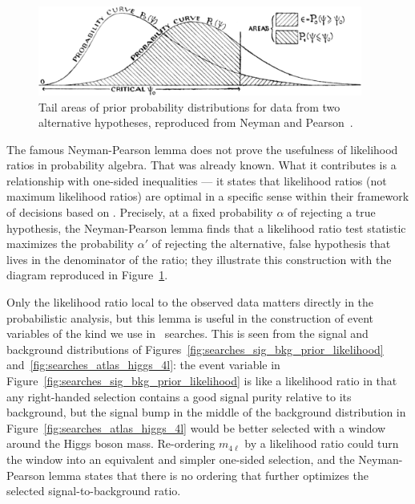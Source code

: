 \begin{figure}[tp]
\centering
\includegraphics[width=0.95\textwidth]{figures/searches_np_curves_crop.png}
\caption[
Tail areas of prior probability distributions for data from two alternative
hypotheses, reproduced from Neyman and Pearson
]{%
Tail areas of prior probability distributions for data from two alternative
hypotheses, reproduced from Neyman and Pearson~\cite{neymanpearson1933lemma}.
}
\label{fig:searches_np_tails}
\end{figure}

The famous Neyman-Pearson lemma does not prove the usefulness of likelihood
ratios in probability algebra.
That was already known.
What it contributes is a relationship with one-sided inequalities ---
it states that likelihood ratios (not maximum likelihood ratios)
are optimal in a specific sense within their framework of decisions
based on \pvalues.
Precisely, at a fixed probability $\alpha$ of rejecting a true hypothesis,
the Neyman-Pearson lemma finds that a likelihood ratio test statistic maximizes
the probability $\alpha'$ of rejecting the alternative, false hypothesis that
lives in the denominator of the ratio; they illustrate this construction with
the diagram reproduced in Figure~\ref{fig:searches_np_tails}.

Only the likelihood ratio local to the observed data matters directly in the
probabilistic analysis, but this lemma is useful in the construction
of event variables of the kind we use in \atlas\ searches.
This is seen from the signal and background distributions of
Figures~\ref{fig:searches_sig_bkg_prior_likelihood}
and~\ref{fig:searches_atlas_higgs_4l}:
the event variable in Figure~\ref{fig:searches_sig_bkg_prior_likelihood} is
like a likelihood ratio in that any right-handed selection contains a good
signal purity relative to its background, but the signal bump in the
middle of the background distribution in
Figure~\ref{fig:searches_atlas_higgs_4l} would be better selected with a
window around the Higgs boson mass.
Re-ordering $m_{4\ell}$ by a likelihood ratio could turn the window
into an equivalent and simpler one-sided selection, and the Neyman-Pearson
lemma states that there is no ordering that further optimizes the selected
signal-to-background ratio.

